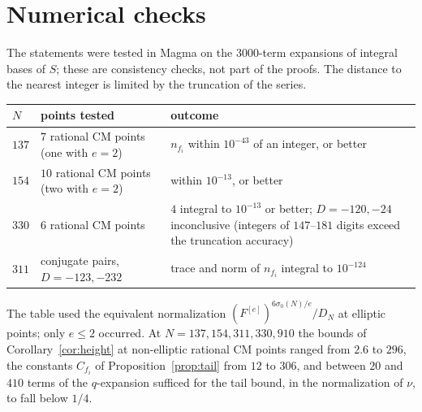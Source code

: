 \documentclass[11pt]{amsart}
\theoremstyle{definition}
\theoremstyle{remark}
\newcommand{\sz}{\sigma_0}
\begin{document}
\section{Numerical checks}\label{sec:num}

The statements were tested in Magma on the $3000$-term expansions of integral
bases of $S$; these are consistency checks, not part of the proofs.
The distance to the nearest integer is limited by the truncation of the series.

\begin{center}
\begin{tabular}{llp{7.6cm}}
$N$ & points tested & outcome\\\hline
$137$ & $7$ rational CM points (one with $e=2$) & $n_{f_i}$ within $10^{-43}$ of an integer, or better\\
$154$ & $10$ rational CM points (two with $e=2$) & within $10^{-13}$, or better\\
$330$ & $6$ rational CM points & $4$ integral to $10^{-13}$ or better; $D=-120,-24$ inconclusive (integers of $147$--$181$ digits exceed the truncation accuracy)\\
$311$ & conjugate pairs, $D=-123,-232$ & trace and norm of $n_{f_i}$ integral to $10^{-124}$\\
\end{tabular}
\end{center}

The table used the equivalent normalization
$(F^{[e]})^{6\sz(N)/e}/D_N$ at elliptic points; only $e\le2$ occurred.  At
$N=137,154,311,330,910$ the bounds of Corollary~\ref{cor:height} at non-elliptic
rational CM points ranged from $2.6$ to $296$, the constants $C_{f_i}$ of
Proposition~\ref{prop:tail} from $12$ to $306$, and between $20$ and $410$ terms
of the $q$-expansion sufficed for the tail bound, in the normalization of $\nu$, to fall below $1/4$.
\end{document}
